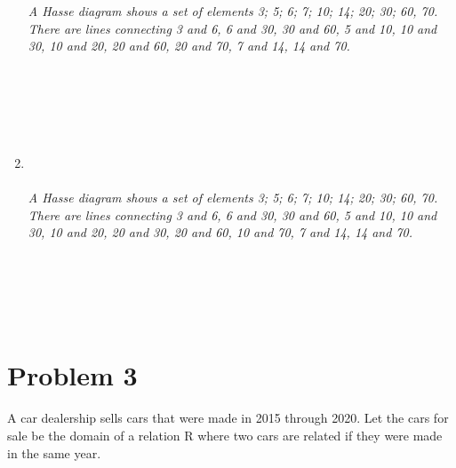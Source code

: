 \documentclass{amsart}
\theoremstyle{definition}
\theoremstyle{Exercise}
\theoremstyle{remark}
\theoremstyle{rule}
\numberwithin{equation}{section}
\begin{document}
\begin{enumerate}[label=(\alph*)]
{}
\\\\
{\color{blue}{\bf Figure 4:} \emph{A Hasse diagram shows a set of elements {3; 5; 6; 7; 10; 14; 20; 30; 60, 70}. There are lines connecting 3 and 6, 6 and 30, 30 and 60, 5 and 10, 10 and 30, 10 and 20, 20 and 60, 20 and 70, 7 and 14, 14 and 70.
}
}
\\
\\
\\\\
\newpage
~\\~\\
\item
{}
\\\\
{\color{blue}{\bf Figure 5:} \emph{A Hasse diagram shows a set of elements {3; 5; 6; 7; 10; 14; 20; 30; 60, 70}. There are lines connecting 3 and 6, 6 and 30, 30 and 60, 5 and 10, 10 and 30, 10 and 20, 20 and 30, 20 and 60, 10 and 70, 7 and 14, 14 and 70.
}
}
\\\\
\\\\

\end{enumerate}
  \newpage
~\\
  \section*{Problem 3}
  A car dealership sells cars that were made in 2015 through 2020. Let the cars for sale be the domain of a relation R where two cars are related if they were made in the same year.
\end{document}

